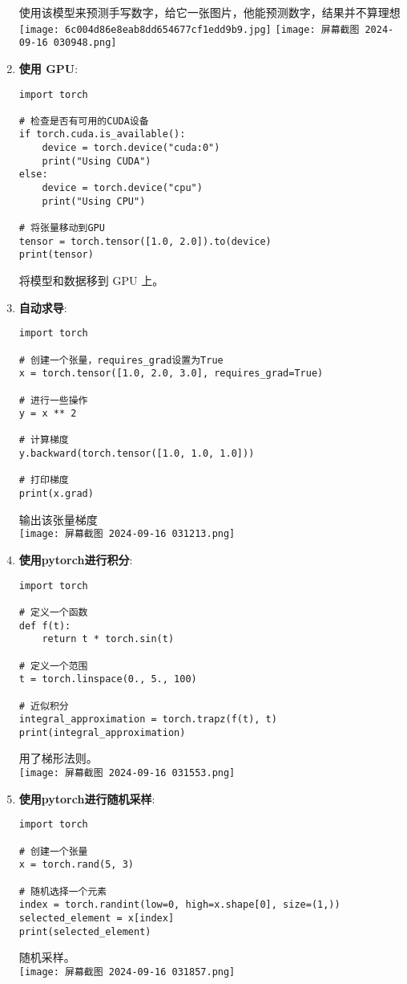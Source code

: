 \documentclass{ctexart}
\begin{document}
\begin{enumerate}[label=\arabic*.]
\begin{lstlisting}
\end{lstlisting}
使用该模型来预测手写数字，给它一张图片，他能预测数字，结果并不算理想\\
\texttt{[image: 6c004d86e8eab8dd654677cf1edd9b9.jpg]}
\texttt{[image: 屏幕截图 2024-09-16 030948.png]}
\item \textbf{使用 GPU}:
\begin{lstlisting}
import torch

# 检查是否有可用的CUDA设备
if torch.cuda.is_available():
    device = torch.device("cuda:0")
    print("Using CUDA")
else:
    device = torch.device("cpu")
    print("Using CPU")

# 将张量移动到GPU
tensor = torch.tensor([1.0, 2.0]).to(device)
print(tensor)
\end{lstlisting}
将模型和数据移到 GPU 上。

\item \textbf{自动求导}:
\begin{lstlisting}
import torch

# 创建一个张量，requires_grad设置为True
x = torch.tensor([1.0, 2.0, 3.0], requires_grad=True)

# 进行一些操作
y = x ** 2

# 计算梯度
y.backward(torch.tensor([1.0, 1.0, 1.0]))

# 打印梯度
print(x.grad)
\end{lstlisting}
输出该张量梯度\\
\texttt{[image: 屏幕截图 2024-09-16 031213.png]}

\item \textbf{使用pytorch进行积分}:
\begin{lstlisting}
import torch

# 定义一个函数
def f(t):
    return t * torch.sin(t)

# 定义一个范围
t = torch.linspace(0., 5., 100)

# 近似积分
integral_approximation = torch.trapz(f(t), t)
print(integral_approximation)
\end{lstlisting}
用了梯形法则。\\
\texttt{[image: 屏幕截图 2024-09-16 031553.png]}
\item \textbf{使用pytorch进行随机采样}:
\begin{lstlisting}
import torch

# 创建一个张量
x = torch.rand(5, 3)

# 随机选择一个元素
index = torch.randint(low=0, high=x.shape[0], size=(1,))
selected_element = x[index]
print(selected_element)
\end{lstlisting}
随机采样。\\
\texttt{[image: 屏幕截图 2024-09-16 031857.png]}
\end{enumerate}
\end{document}
